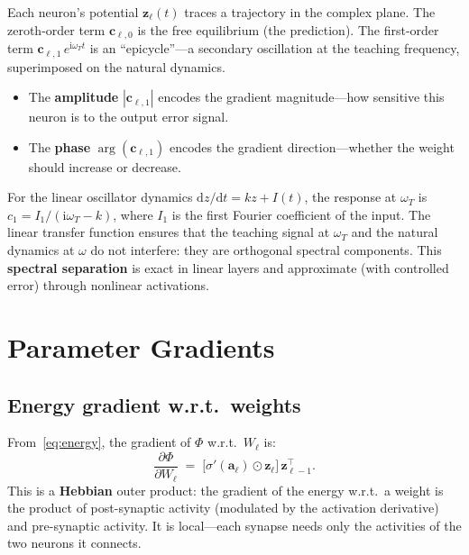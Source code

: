 \documentclass[11pt]{article}
\newcommand{\im}{\mathrm{i}}
\newcommand{\dd}{\mathrm{d}}
\theoremstyle{definition}
\begin{document}
Each neuron's potential $\bm{z}_\ell(t)$ traces a trajectory in the
complex plane.  The zeroth-order term $\bm{c}_{\ell,0}$ is the free
equilibrium (the prediction).  The first-order term
$\bm{c}_{\ell,1}\,e^{\im\omega_T t}$ is an ``epicycle''---a secondary
oscillation at the teaching frequency, superimposed on the natural
dynamics.

\begin{itemize}
\item The \textbf{amplitude} $|\bm{c}_{\ell,1}|$ encodes the gradient
  magnitude---how sensitive this neuron is to the output error signal.
\item The \textbf{phase} $\arg(\bm{c}_{\ell,1})$ encodes the gradient
  direction---whether the weight should increase or decrease.
\end{itemize}

For the linear oscillator dynamics $\dd z/\dd t = kz + I(t)$, the
response at $\omega_T$ is $c_1 = I_1/(\im\omega_T - k)$, where $I_1$
is the first Fourier coefficient of the input.  The linear transfer
function ensures that the teaching signal at $\omega_T$ and the natural
dynamics at $\omega$ do not interfere: they are orthogonal spectral
components.  This \textbf{spectral separation} is exact in linear
layers and approximate (with controlled error) through nonlinear
activations.

\section{Parameter Gradients}\label{sec:param-grad}

\subsection{Energy gradient w.r.t.\ weights}

From~\eqref{eq:energy}, the gradient of $\Phi$ w.r.t.\ $W_\ell$ is:
\begin{equation}\label{eq:dPhi-dW}
  \frac{\partial\Phi}{\partial W_\ell}
  \;=\;
  \bigl[\sigma'(\bm{a}_\ell)\odot\bm{z}_\ell\bigr]
  \,\bm{z}_{\ell-1}^{\!\top}.
\end{equation}
This is a \textbf{Hebbian} outer product: the gradient of the energy
w.r.t.\ a weight is the product of post-synaptic activity
(modulated by the activation derivative) and pre-synaptic activity.
It is local---each synapse needs only the activities of the two neurons
it connects.
\end{document}
